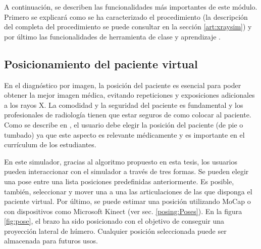 A continuación, se describen las funcionalidades más importantes de este módulo. Primero se explicará como se ha caracterizado el procedimiento (la descripción del completa del procedimiento se puede consultar en la sección \ref{art:xraysim}) y por último las funcionalidades de herramienta de clase y aprendizaje .




\subsection{Posicionamiento del paciente virtual}
\label{xray:posing}

En el diagnóstico por imagen, la posición del paciente es esencial para poder obtener la mejor imagen médica, evitando repeticiones y exposiciones adicionales a los rayos X. La comodidad y la seguridad del paciente es fundamental y los profesionales de radiología tienen que estar seguros de como colocar al paciente. Como se describe en \cite{carver2012medical,manualpractico}, el usuario debe elegir la posición del paciente (de pie o tumbado) ya que este aspecto es relevante médicamente y es importante en el currículum de los estudiantes.

En este simulador, gracias al algoritmo propuesto en esta tesis, %
los usuarios pueden interaccionar con el simulador a través %
de tres formas. Se pueden elegir una pose entre una lista posiciones predefinidas anteriormente. Es posible, también, seleccionar y mover una a una las articulaciones de las que disponga el paciente virtual. Por último, se puede estimar una posición utilizando \ac{MoCap} o con dispositivos como Microsoft Kinect (ver sec. \ref{posing:Poses}). 
%
En la figura \ref{fig:pose}, el brazo ha sido posicionado con el objetivo de conseguir una proyección lateral de húmero. Cualquier posición seleccionada puede ser almacenada para futuros usos.



		
